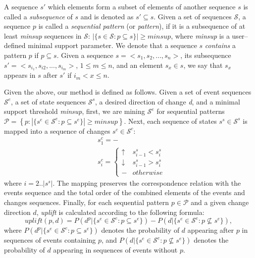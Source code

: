\documentclass[runningheads,a4paper]{llncs}
\begin{document}
A sequence $s'$ which elements form a subset of elements of another sequence $s$ is called a \textit{subsequence} of $s$ and is denoted as $s'\subseteq s$.
Given a set of sequences $\mathcal{S}$, a sequence $p$ is called a \textit{sequential pattern} (or \textit{pattern}), if it is a subsequence of at least \textit{minsup} sequences in $\mathcal{S}$: $|\{s\in\mathcal{S}:p\subseteq s\}|\geq\textit{minsup}$, where \textit{minsup} is a user--defined minimal support parameter.
We denote that a sequence $s$ \textit{contains} a pattern $p$ if $p\subseteq s$.
Given a sequence $s=<s_1,s_2,...,s_n>$, its subsequence $s'=<s_{i_1}, s_{i2}, ..., s_{i_m}>$, $1\leq m\leq n$, and an element $s_x\in s$, we say that $s_x$ appears in $s$ after $s'$ if $i_m<x\leq n$.

Given the above, our method is defined as follows.
Given a set of event sequences $\mathcal{S}^e$, a set of state sequences $\mathcal{S}^s$, a desired direction of change \textit{d}, and a minimal support threshold \textit{minsup}, first, we are mining $\mathcal{S}^e$ for sequential patterns $\mathcal{P}=\left\{p:|\{s^e\in\mathcal{S}^e:p\subseteq s^e\}|\geq\textit{minsup}\right\}$.
Next, each sequence of states $s^s\in\mathcal{S}^s$ is mapped into a sequence of changes $s^c\in\mathcal{S}^c$:
\begin{equation*}
\begin{split}
&s^c_1=-\\
&s^c_i=\begin{cases}
	\uparrow & s^s_{i-1}<s^s_i \\
	\downarrow & s^s_{i-1}>s^s_i \\
	- & otherwise
\end{cases}
\end{split}
\end{equation*}
where $i=2..|s^s|$.
The mapping preserves the correspondence relation with the events sequence and the total order of the combined elements of the events and changes sequences.
Finally, for each sequential pattern $p\in\mathcal{P}$ and a given change direction $d$, \textit{uplift} is calculated according to the following formula:
\begin{equation*}
\textit{uplift}(p,d)=P(d^p|\{s^e\in\mathcal{S}^e:p\subseteq s^e\})-P(d|\{s^e\in\mathcal{S}^e:p\not\subseteq s^e\}),
\end{equation*}
where $P(d^p|\{s^e\in\mathcal{S}^e:p\subseteq s^e\})$ denotes the probability of $d$ appearing after $p$ in sequences of events containing $p$, and $P(d|\{s^e\in\mathcal{S}^e:p\not\subseteq s^e\})$ denotes the probability of $d$ appearing in sequences of events without $p$.
\end{document}
